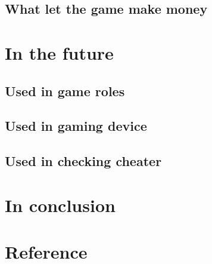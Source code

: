 \documentclass[12pt]{article}
\begin{document}
        \subsection{What let the game make money}
    \section{In the future}
        \subsection{Used in game roles}
        \subsection{Used in gaming device}
        \subsection{Used in checking cheater}
    \section{In conclusion}
    \pagebreak
    \section{Reference}
\end{document}
